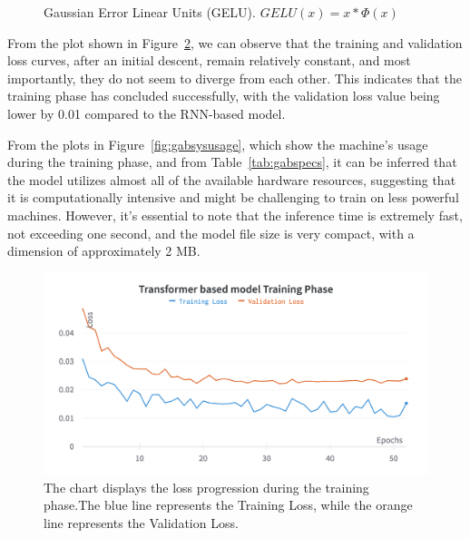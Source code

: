 \begin{figure}[H]
	\centering
	\caption{Gaussian Error Linear Units (GELU). $GELU(x) = x * \Phi(x)$}
	\label{fig:gelu}
\end{figure}

From the plot shown in Figure~\ref{fig:gabtrainchart}, we can observe that the training and validation loss curves, after an initial descent, remain relatively constant, and most importantly, they do not seem to diverge from each other. This indicates that the training phase has concluded successfully, with the validation loss value being lower by 0.01 compared to the RNN-based model.

From the plots in Figure~\ref{fig:gabsysusage}, which show the machine's usage during the training phase, and from Table~\ref{tab:gabspecs}, it can be inferred that the model utilizes almost all of the available hardware resources, suggesting that it is computationally intensive and might be challenging to train on less powerful machines. However, it's essential to note that the inference time is extremely fast, not exceeding one second, and the model file size is very compact, with a dimension of approximately 2 MB.

\begin{figure}[]
	\centering
	\includegraphics[width=.9\textwidth]{chapters/3_models/imgs/gab/gabtraining.png}
	\caption{The chart displays the loss progression during the training phase.The blue line represents the Training Loss, while the orange line represents the Validation Loss.}
	\label{fig:gabtrainchart}
\end{figure}

